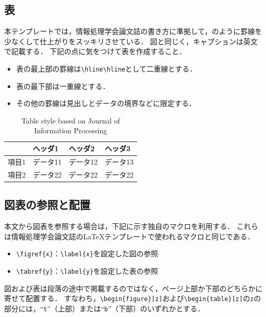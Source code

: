 \documentclass[a4j,9pt,twocolumn,uplatex]{jsarticle}
\begin{document}
\subsection{表}
本テンプレートでは，情報処理学会論文誌の書き方に準拠して，のように罫線を少なくして仕上がりをスッキリさせている．
図と同じく，キャプションは英文で記載する．
下記の点に気をつけて表を作成すること．
\begin{itemize}
    \item 表の最上部の罫線は\verb|\hline\hline|として二重線とする．
    \item 表の最下部は一重線とする．
    \item その他の罫線は見出しとデータの境界などに限定する．
\end{itemize}

\begin{table}[tb]
    \centering
    \footnotesize	%
    \caption{Table style based on Journal of Information Processing}
    \label{tab:sample}
    \begin{tabular}{l|lll}
        \hline\hline
         & ヘッダ1 & ヘッダ2 & ヘッダ3 \\ 
        \hline 
        項目1 & データ11 & データ12 & データ13 \\
        項目2 & データ22 & データ22 & データ22 \\  
        \hline 
    \end{tabular}
\end{table}

\subsection{図表の参照と配置}
本文から図表を参照する場合は，下記に示す独自のマクロを利用する．
これらは情報処理学会論文誌の\LaTeX テンプレートで使われるマクロと同じである．
\begin{itemize}
    \item \verb|\figref{x}|：\verb|\label{x}|を設定した図の参照
    \item \verb|\tabref{y}|：\verb|\label{y}|を設定した表の参照
\end{itemize}

図および表は段落の途中で掲載するのではなく，ページ上部か下部のどちらかに寄せて配置する．
すなわち，\verb|\begin{figure}[z]|および\verb|\begin{table}[z]|の\texttt{z}の部分には，``\texttt{t}''（上部）または``\texttt{b}''（下部）のいずれかとする．
\end{document}
